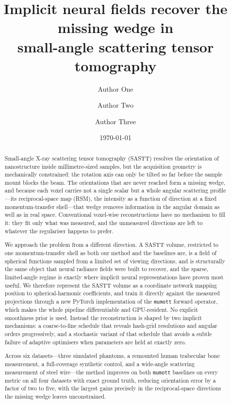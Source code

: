 \documentclass[11pt,a4paper]{article}
\title{\bfseries Implicit neural fields recover the missing wedge in\\
small-angle scattering tensor tomography}
\author[1]{Author One}
\author[1]{Author Two}
\author[2]{Author Three}
\affil[1]{Swiss Data Science Center, EPFL and ETH Zurich, Switzerland}
\affil[2]{Affiliation to be completed}
\date{\today}
\begin{document}
\maketitle

\begin{abstract}
\noindent
Small-angle X-ray scattering tensor tomography (SASTT) resolves the orientation of
nanostructure inside millimetre-sized samples, but the acquisition geometry is
mechanically constrained: the rotation axis can only be tilted so far before the sample
mount blocks the beam. The orientations that are never reached form a missing wedge, and
because each voxel carries not a single scalar but a whole angular scattering
profile---its reciprocal-space map (RSM), the intensity as a function of direction at a
fixed momentum-transfer shell---that wedge removes information in the angular domain as
well as in real space. Conventional voxel-wise reconstructions have no mechanism to fill
it: they fit only what was measured, and the unmeasured directions are left to whatever
the regulariser happens to prefer.

We approach the problem from a different direction. A SASTT volume, restricted to one
momentum-transfer shell as both our method and the baselines are, is a field of spherical
functions sampled from a limited set of viewing directions, and is structurally the same
object that neural radiance fields were built to recover, and the sparse, limited-angle
regime is exactly where implicit neural representations have proven most useful. We
therefore represent the SASTT volume as a coordinate network mapping position to
spherical-harmonic coefficients, and train it directly against the measured projections
through a new PyTorch implementation of the \texttt{mumott} forward operator, which makes
the whole pipeline differentiable and GPU-resident. No explicit smoothness prior is used.
Instead the reconstruction is shaped by two implicit mechanisms: a coarse-to-fine schedule
that reveals hash-grid resolutions and angular orders progressively, and a stochastic
variant of that schedule that avoids a subtle failure of adaptive optimisers when
parameters are held at exactly zero.

Across six datasets---three simulated phantoms, a remounted human trabecular bone
measurement, a full-coverage synthetic control, and a wide-angle scattering measurement of
steel wire---the method improves on both \texttt{mumott} baselines on every metric on all
four datasets with exact ground truth, reducing orientation error by a factor of two to
five, with the largest gains precisely in the reciprocal-space directions the missing wedge
leaves unconstrained.
\end{abstract}
\end{document}
